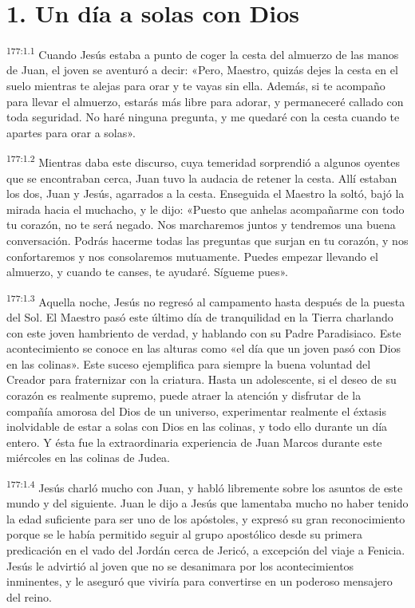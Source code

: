 \section*{1. Un día a solas con Dios}
\par
\textsuperscript{177:1.1} Cuando Jesús estaba a punto de coger la cesta del almuerzo de las manos de Juan, el joven se aventuró a decir: «Pero, Maestro, quizás dejes la cesta en el suelo mientras te alejas para orar y te vayas sin ella. Además, si te acompaño para llevar el almuerzo, estarás más libre para adorar, y permaneceré callado con toda seguridad. No haré ninguna pregunta, y me quedaré con la cesta cuando te apartes para orar a solas».

\par
\textsuperscript{177:1.2} Mientras daba este discurso, cuya temeridad sorprendió a algunos oyentes que se encontraban cerca, Juan tuvo la audacia de retener la cesta. Allí estaban los dos, Juan y Jesús, agarrados a la cesta. Enseguida el Maestro la soltó, bajó la mirada hacia el muchacho, y le dijo: «Puesto que anhelas acompañarme con todo tu corazón, no te será negado. Nos marcharemos juntos y tendremos una buena conversación. Podrás hacerme todas las preguntas que surjan en tu corazón, y nos confortaremos y nos consolaremos mutuamente. Puedes empezar llevando el almuerzo, y cuando te canses, te ayudaré. Sígueme pues».

\par
\textsuperscript{177:1.3} Aquella noche, Jesús no regresó al campamento hasta después de la puesta del Sol. El Maestro pasó este último día de tranquilidad en la Tierra charlando con este joven hambriento de verdad, y hablando con su Padre Paradisiaco. Este acontecimiento se conoce en las alturas como «el día que un joven pasó con Dios en las colinas». Este suceso ejemplifica para siempre la buena voluntad del Creador para fraternizar con la criatura. Hasta un adolescente, si el deseo de su corazón es realmente supremo, puede atraer la atención y disfrutar de la compañía amorosa del Dios de un universo, experimentar realmente el éxtasis inolvidable de estar a solas con Dios en las colinas, y todo ello durante un día entero. Y ésta fue la extraordinaria experiencia de Juan Marcos durante este miércoles en las colinas de Judea.

\par
\textsuperscript{177:1.4} Jesús charló mucho con Juan, y habló libremente sobre los asuntos de este mundo y del siguiente. Juan le dijo a Jesús que lamentaba mucho no haber tenido la edad suficiente para ser uno de los apóstoles, y expresó su gran reconocimiento porque se le había permitido seguir al grupo apostólico desde su primera predicación en el vado del Jordán cerca de Jericó, a excepción del viaje a Fenicia. Jesús le advirtió al joven que no se desanimara por los acontecimientos inminentes, y le aseguró que viviría para convertirse en un poderoso mensajero del reino.

